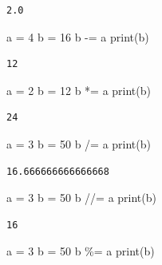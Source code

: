 \documentclass[
  spanish,
  letterpaper,
]{scrbook}
\newenvironment{Shaded}{\begin{snugshade}}{\end{snugshade}}
\newcommand{\BuiltInTok}[1]{\textcolor[rgb]{0.00,0.23,0.31}{#1}}
\newcommand{\DecValTok}[1]{\textcolor[rgb]{0.68,0.00,0.00}{#1}}
\newcommand{\NormalTok}[1]{\textcolor[rgb]{0.00,0.23,0.31}{#1}}
\newcommand{\OperatorTok}[1]{\textcolor[rgb]{0.37,0.37,0.37}{#1}}
\theoremstyle{definition}
\theoremstyle{remark}
\begin{document}
\begin{verbatim}
2.0
\end{verbatim}

\begin{Shaded}
\begin{Highlighting}[]
\NormalTok{a }\OperatorTok{=}  \DecValTok{4}
\NormalTok{b }\OperatorTok{=} \DecValTok{16}
\NormalTok{b }\OperatorTok{{-}=}\NormalTok{ a  }
\BuiltInTok{print}\NormalTok{(b)}
\end{Highlighting}
\end{Shaded}

\begin{verbatim}
12
\end{verbatim}

\begin{Shaded}
\begin{Highlighting}[]
\NormalTok{a }\OperatorTok{=} \DecValTok{2}
\NormalTok{b }\OperatorTok{=} \DecValTok{12}
\NormalTok{b }\OperatorTok{*=}\NormalTok{ a  }
\BuiltInTok{print}\NormalTok{(b)}
\end{Highlighting}
\end{Shaded}

\begin{verbatim}
24
\end{verbatim}

\begin{Shaded}
\begin{Highlighting}[]
\NormalTok{a }\OperatorTok{=} \DecValTok{3}
\NormalTok{b }\OperatorTok{=} \DecValTok{50}
\NormalTok{b }\OperatorTok{/=}\NormalTok{ a }
\BuiltInTok{print}\NormalTok{(b)}
\end{Highlighting}
\end{Shaded}

\begin{verbatim}
16.666666666666668
\end{verbatim}

\begin{Shaded}
\begin{Highlighting}[]
\NormalTok{a }\OperatorTok{=} \DecValTok{3}
\NormalTok{b }\OperatorTok{=} \DecValTok{50}
\NormalTok{b }\OperatorTok{//=}\NormalTok{ a }
\BuiltInTok{print}\NormalTok{(b)}
\end{Highlighting}
\end{Shaded}

\begin{verbatim}
16
\end{verbatim}

\begin{Shaded}
\begin{Highlighting}[]
\NormalTok{a }\OperatorTok{=} \DecValTok{3}
\NormalTok{b }\OperatorTok{=} \DecValTok{50}
\NormalTok{b }\OperatorTok{\%=}\NormalTok{ a}
\BuiltInTok{print}\NormalTok{(b)}
\end{Highlighting}
\end{Shaded}
\end{document}
